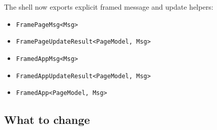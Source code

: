 The shell now exports explicit framed message and update helpers:

\begin{itemize}
\tightlist
\item
  \texttt{F\allowbreak{}r\allowbreak{}a\allowbreak{}m\allowbreak{}e\allowbreak{}P\allowbreak{}a\allowbreak{}g\allowbreak{}e\allowbreak{}M\allowbreak{}s\allowbreak{}g\allowbreak{}<\allowbreak{}M\allowbreak{}s\allowbreak{}g\allowbreak{}>}
\item
  \texttt{F\allowbreak{}r\allowbreak{}a\allowbreak{}m\allowbreak{}e\allowbreak{}P\allowbreak{}a\allowbreak{}g\allowbreak{}e\allowbreak{}U\allowbreak{}p\allowbreak{}d\allowbreak{}a\allowbreak{}t\allowbreak{}e\allowbreak{}R\allowbreak{}e\allowbreak{}s\allowbreak{}u\allowbreak{}l\allowbreak{}t\allowbreak{}<\allowbreak{}P\allowbreak{}a\allowbreak{}g\allowbreak{}e\allowbreak{}M\allowbreak{}o\allowbreak{}d\allowbreak{}e\allowbreak{}l\allowbreak{},\allowbreak{} \allowbreak{}M\allowbreak{}s\allowbreak{}g\allowbreak{}>}
\item
  \texttt{F\allowbreak{}r\allowbreak{}a\allowbreak{}m\allowbreak{}e\allowbreak{}d\allowbreak{}A\allowbreak{}p\allowbreak{}p\allowbreak{}M\allowbreak{}s\allowbreak{}g\allowbreak{}<\allowbreak{}M\allowbreak{}s\allowbreak{}g\allowbreak{}>}
\item
  \texttt{F\allowbreak{}r\allowbreak{}a\allowbreak{}m\allowbreak{}e\allowbreak{}d\allowbreak{}A\allowbreak{}p\allowbreak{}p\allowbreak{}U\allowbreak{}p\allowbreak{}d\allowbreak{}a\allowbreak{}t\allowbreak{}e\allowbreak{}R\allowbreak{}e\allowbreak{}s\allowbreak{}u\allowbreak{}l\allowbreak{}t\allowbreak{}<\allowbreak{}P\allowbreak{}a\allowbreak{}g\allowbreak{}e\allowbreak{}M\allowbreak{}o\allowbreak{}d\allowbreak{}e\allowbreak{}l\allowbreak{},\allowbreak{} \allowbreak{}M\allowbreak{}s\allowbreak{}g\allowbreak{}>}
\item
  \texttt{F\allowbreak{}r\allowbreak{}a\allowbreak{}m\allowbreak{}e\allowbreak{}d\allowbreak{}A\allowbreak{}p\allowbreak{}p\allowbreak{}<\allowbreak{}P\allowbreak{}a\allowbreak{}g\allowbreak{}e\allowbreak{}M\allowbreak{}o\allowbreak{}d\allowbreak{}e\allowbreak{}l\allowbreak{},\allowbreak{} \allowbreak{}M\allowbreak{}s\allowbreak{}g\allowbreak{}>}
\end{itemize}

\subsection{What to change}\label{record-264-what-to-change}


